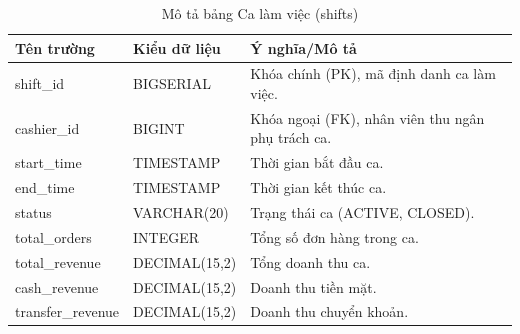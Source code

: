 \documentclass[../20232006p.tex]{subfiles}
\begin{document}
\begin{table}[H]
    \centering
    \caption{Mô tả bảng Ca làm việc (shifts)}
    \label{tab:shifts}
    \begin{tabular}{|p{3.5cm}|p{3cm}|p{7.5cm}|}
        \hline
        \textbf{Tên trường} & \textbf{Kiểu dữ liệu} & \textbf{Ý nghĩa/Mô tả}                            \\
        \hline
        shift\_id           & BIGSERIAL             & Khóa chính (PK), mã định danh ca làm việc.        \\
        \hline
        cashier\_id         & BIGINT                & Khóa ngoại (FK), nhân viên thu ngân phụ trách ca. \\
        \hline
        start\_time         & TIMESTAMP             & Thời gian bắt đầu ca.                             \\
        \hline
        end\_time           & TIMESTAMP             & Thời gian kết thúc ca.                            \\
        \hline
        status              & VARCHAR(20)           & Trạng thái ca (ACTIVE, CLOSED).                   \\
        \hline
        total\_orders       & INTEGER               & Tổng số đơn hàng trong ca.                        \\
        \hline
        total\_revenue      & DECIMAL(15,2)         & Tổng doanh thu ca.                                \\
        \hline
        cash\_revenue       & DECIMAL(15,2)         & Doanh thu tiền mặt.                               \\
        \hline
        transfer\_revenue   & DECIMAL(15,2)         & Doanh thu chuyển khoản.                           \\
        \hline
    \end{tabular}
\end{table}
\end{document}
